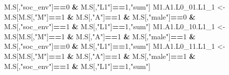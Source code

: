 \documentclass[
]{book}
\newenvironment{Shaded}{\begin{snugshade}}{\end{snugshade}}
\newcommand{\DecValTok}[1]{\textcolor[rgb]{0.00,0.00,0.81}{#1}}
\newcommand{\NormalTok}[1]{#1}
\newcommand{\OtherTok}[1]{\textcolor[rgb]{0.56,0.35,0.01}{#1}}
\newcommand{\SpecialCharTok}[1]{\textcolor[rgb]{0.81,0.36,0.00}{\textbf{#1}}}
\newcommand{\StringTok}[1]{\textcolor[rgb]{0.31,0.60,0.02}{#1}}
\begin{document}
\begin{Shaded}
\begin{Highlighting}[]
\NormalTok{                            M.S[,}\StringTok{"soc\_env"}\NormalTok{]}\SpecialCharTok{==}\DecValTok{0} \SpecialCharTok{\&}\NormalTok{ M.S[,}\StringTok{"L1"}\NormalTok{]}\SpecialCharTok{==}\DecValTok{1}\NormalTok{,}\StringTok{"sum"}\NormalTok{]}
\NormalTok{  M1.A1.L0\_01.L1\_1 }\OtherTok{\textless{}{-}}\NormalTok{ M.S[M.S[,}\StringTok{"M"}\NormalTok{]}\SpecialCharTok{==}\DecValTok{1} \SpecialCharTok{\&}\NormalTok{ M.S[,}\StringTok{"A"}\NormalTok{]}\SpecialCharTok{==}\DecValTok{1} \SpecialCharTok{\&}\NormalTok{ M.S[,}\StringTok{"male"}\NormalTok{]}\SpecialCharTok{==}\DecValTok{0} \SpecialCharTok{\&} 
\NormalTok{                            M.S[,}\StringTok{"soc\_env"}\NormalTok{]}\SpecialCharTok{==}\DecValTok{1} \SpecialCharTok{\&}\NormalTok{ M.S[,}\StringTok{"L1"}\NormalTok{]}\SpecialCharTok{==}\DecValTok{1}\NormalTok{,}\StringTok{"sum"}\NormalTok{]}
\NormalTok{  M1.A1.L0\_10.L1\_1 }\OtherTok{\textless{}{-}}\NormalTok{ M.S[M.S[,}\StringTok{"M"}\NormalTok{]}\SpecialCharTok{==}\DecValTok{1} \SpecialCharTok{\&}\NormalTok{ M.S[,}\StringTok{"A"}\NormalTok{]}\SpecialCharTok{==}\DecValTok{1} \SpecialCharTok{\&}\NormalTok{ M.S[,}\StringTok{"male"}\NormalTok{]}\SpecialCharTok{==}\DecValTok{1} \SpecialCharTok{\&} 
\NormalTok{                            M.S[,}\StringTok{"soc\_env"}\NormalTok{]}\SpecialCharTok{==}\DecValTok{0} \SpecialCharTok{\&}\NormalTok{ M.S[,}\StringTok{"L1"}\NormalTok{]}\SpecialCharTok{==}\DecValTok{1}\NormalTok{,}\StringTok{"sum"}\NormalTok{]}
\NormalTok{  M1.A1.L0\_11.L1\_1 }\OtherTok{\textless{}{-}}\NormalTok{ M.S[M.S[,}\StringTok{"M"}\NormalTok{]}\SpecialCharTok{==}\DecValTok{1} \SpecialCharTok{\&}\NormalTok{ M.S[,}\StringTok{"A"}\NormalTok{]}\SpecialCharTok{==}\DecValTok{1} \SpecialCharTok{\&}\NormalTok{ M.S[,}\StringTok{"male"}\NormalTok{]}\SpecialCharTok{==}\DecValTok{1} \SpecialCharTok{\&} 
\NormalTok{                            M.S[,}\StringTok{"soc\_env"}\NormalTok{]}\SpecialCharTok{==}\DecValTok{1} \SpecialCharTok{\&}\NormalTok{ M.S[,}\StringTok{"L1"}\NormalTok{]}\SpecialCharTok{==}\DecValTok{1}\NormalTok{,}\StringTok{"sum"}\NormalTok{]}
  

\end{Highlighting}
\end{Shaded}
\end{document}
